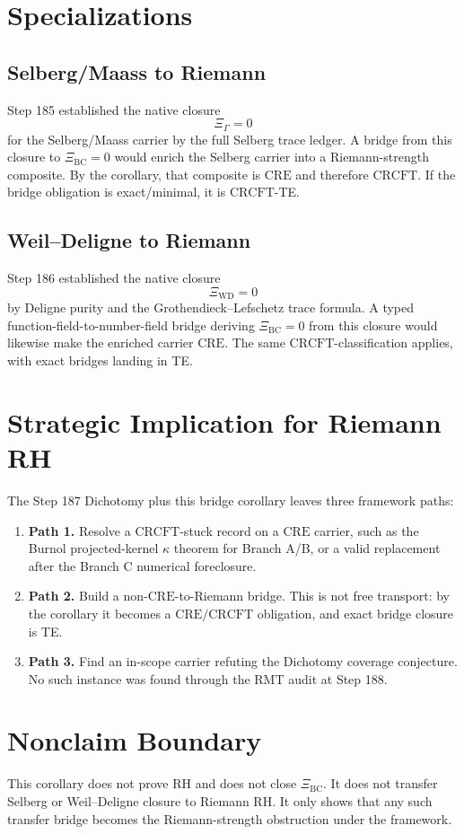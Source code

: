 \documentclass[11pt]{article}
\newcommand{\XiBC}{\Xi_{\mathrm{BC}}}
\newcommand{\XiGamma}{\Xi_{\Gamma}}
\newcommand{\XiWD}{\Xi_{\mathrm{WD}}}
\newcommand{\CRE}{\mathrm{CRE}}
\newcommand{\CRCFT}{\mathrm{CRCFT}}
\begin{document}
\section*{Specializations}

\subsection*{Selberg/Maass to Riemann}

Step 185 established the native closure
\[
\XiGamma=0
\]
for the Selberg/Maass carrier by the full Selberg trace ledger.  A bridge
from this closure to \(\XiBC=0\) would enrich the Selberg carrier into a
Riemann-strength composite.  By the corollary, that composite is \(\CRE\) and
therefore \(\CRCFT\).  If the bridge obligation is exact/minimal, it is
\(\CRCFT\)-TE.

\subsection*{Weil--Deligne to Riemann}

Step 186 established the native closure
\[
\XiWD=0
\]
by Deligne purity and the Grothendieck--Lefschetz trace formula.  A typed
function-field-to-number-field bridge deriving \(\XiBC=0\) from this closure
would likewise make the enriched carrier \(\CRE\).  The same
\(\CRCFT\)-classification applies, with exact bridges landing in TE.

\section*{Strategic Implication for Riemann RH}

The Step 187 Dichotomy plus this bridge corollary leaves three framework
paths:
\begin{enumerate}
\item \textbf{Path 1.} Resolve a \(\CRCFT\)-stuck record on a \(\CRE\) carrier, such as the
Burnol projected-kernel \(\kappa\) theorem for Branch A/B, or a valid
replacement after the Branch C numerical foreclosure.
\item \textbf{Path 2.} Build a non-\(\CRE\)-to-Riemann bridge.  This is not free transport: by
the corollary it becomes a \(\CRE/\CRCFT\) obligation, and exact bridge closure
is TE.
\item \textbf{Path 3.} Find an in-scope carrier refuting the Dichotomy coverage conjecture.
No such instance was found through the RMT audit at Step 188.
\end{enumerate}

\section*{Nonclaim Boundary}

This corollary does not prove RH and does not close \(\XiBC\).  It does not
transfer Selberg or Weil--Deligne closure to Riemann RH.  It only shows that
any such transfer bridge becomes the Riemann-strength obstruction under the
framework.
\end{document}

